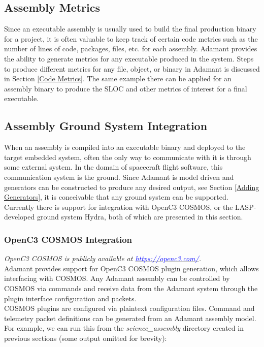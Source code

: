 \subsection{Assembly Metrics}

Since an executable assembly is usually used to build the final production binary for a project, it is often valuable to keep track of certain code metrics such as the number of lines of code, packages, files, etc. for each assembly. Adamant provides the ability to generate metrics for any executable produced in the system. Steps to produce different metrics for any file, object, or binary in Adamant is discussed in Section \ref{Code Metrics}. The same example there can be applied for an assembly binary to produce the SLOC and other metrics of interest for a final executable.

\subsection{Assembly Ground System Integration}

When an assembly is compiled into an executable binary and deployed to the target embedded system, often the only way to communicate with it is through some external system. In the domain of spacecraft flight software, this communication system is the ground. Since Adamant is model driven and generators can be constructed to produce any desired output, see Section \ref{Adding Generators}, it is conceivable that any ground system can be supported. Currently there is support for integration with OpenC3 COSMOS, or the LASP-developed ground system Hydra, both of which are presented in this section.

\subsubsection{OpenC3 COSMOS Integration}

\textit{OpenC3 COSMOS is publicly available at \href{https://openc3.com/}{\textcolor{blue}{https://openc3.com/}}.} \\

Adamant provides support for OpenC3 COSMOS plugin generation, which allows interfacing with COSMOS. Any Adamant assembly can be controlled by COSMOS via commands and receive data from the Adamant system through the plugin interface configuration and packets. \\

COSMOS plugins are configured via plaintext configuration files. Command and telemetry packet definitions can be generated from an Adamant assembly model. For example, we can run this from the \textit{science\_assembly} directory created in previous sections (some output omitted for brevity):

